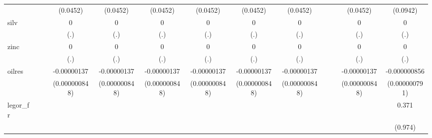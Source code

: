 {\begin{tabular}{l*{12}{c}}
            &                     &                     &    (0.0452)         &    (0.0452)         &    (0.0452)         &    (0.0452)         &    (0.0452)         &    (0.0452)         &                     &                     &    (0.0452)         &    (0.0942)         \\
[1em]
silv        &                     &                     &           0         &           0         &           0         &           0         &           0         &           0         &                     &                     &           0         &           0         \\
            &                     &                     &         (.)         &         (.)         &         (.)         &         (.)         &         (.)         &         (.)         &                     &                     &         (.)         &         (.)         \\
[1em]
zinc        &                     &                     &           0         &           0         &           0         &           0         &           0         &           0         &                     &                     &           0         &           0         \\
            &                     &                     &         (.)         &         (.)         &         (.)         &         (.)         &         (.)         &         (.)         &                     &                     &         (.)         &         (.)         \\
[1em]
oilres      &                     &                     & -0.00000137         & -0.00000137         & -0.00000137         & -0.00000137         & -0.00000137         & -0.00000137         &                     &                     & -0.00000137         &-0.000000856         \\
            &                     &                     &(0.000000848)         &(0.000000848)         &(0.000000848)         &(0.000000848)         &(0.000000848)         &(0.000000848)         &                     &                     &(0.000000848)         &(0.000000791)         \\
[1em]
legor\_fr    &                     &                     &                     &                     &                     &                     &                     &                     &                     &                     &                     &       0.371         \\
            &                     &                     &                     &                     &                     &                     &                     &                     &                     &                     &                     &     (0.974)         \\

\end{tabular}}
